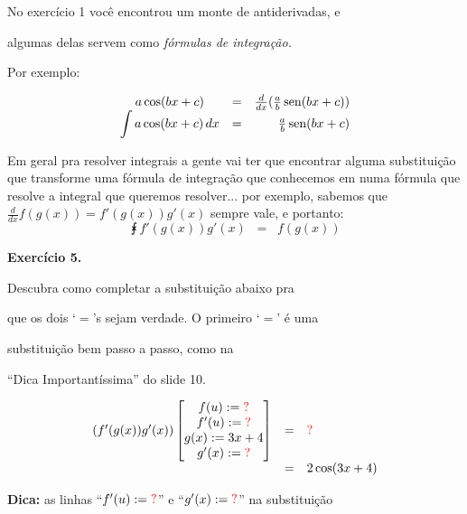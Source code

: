 \documentclass[oneside,12pt]{article}
\begin{document}
\newpage

No exercício 1 você encontrou um monte de antiderivadas, e

algumas delas servem como {\sl fórmulas de integração.}

Por exemplo:


$$\begin{array}{ccr}
                      a \cos(bx+c) &=& \frac{d}{dx} (\frac{a}{b}\operatorname{sen}(bx+c)) \\
  \displaystyle \int {a \cos(bx+c)} \, dx &=&        \frac{a}{b}\operatorname{sen}(bx+c) \\
  \end{array}
$$

Em geral pra resolver integrais a gente vai ter que encontrar alguma
substituição que transforme uma fórmula de integração que conhecemos
em numa fórmula que resolve a integral que queremos resolver... por
exemplo, sabemos que $\frac{d}{dx}f(g(x)) = f'(g(x))g'(x)$ sempre
vale, e portanto:
%
$$ \intx {f'(g(x))g'(x)} \;\; = \;\; f(g(x)) $$


\newpage


{\bf Exercício 5.}

\ssk

\def\rq{\ColorRed{?}}

Descubra como completar a substituição abaixo pra

que os dois `$=$'s sejam verdade. O primeiro `$=$' é uma

substituição bem passo a passo, como na

``Dica Importantíssima'' do slide 10.

$$\begin{array}{rcl}
  \left( f'(g(x))g'(x) \right)
  \Subst{f(u) := \rq \\ f'(u) := \rq \\ g(x) := 3x+4 \\ g'(x) := \rq}
    &=& \rq \\
    &=& 2 \cos(3x+4) \\
  \end{array}
$$

\newpage

{\bf Dica:} as linhas ``$f'(u) := \rq$'' e ``$g'(x) := \rq$'' na
substituição
\end{document}
